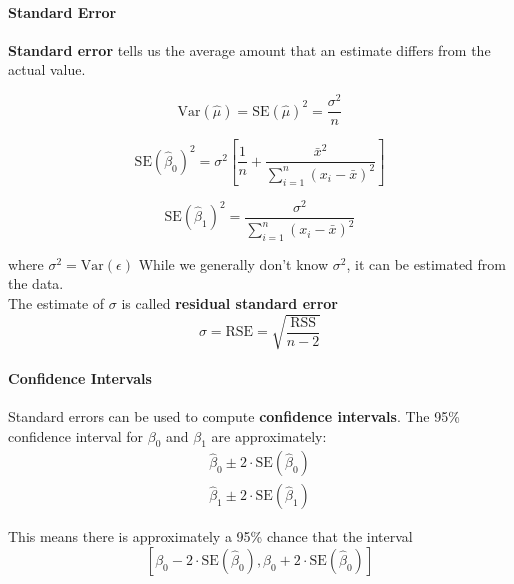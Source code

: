         \paragraph{Standard Error\\}
        \textbf{Standard error} tells us the average amount that an estimate differs from the actual value.
        
        \begin{equation*}
            \text{Var}(\hat \mu) = \text{SE}(\hat \mu)^2 = \frac{\sigma^2}{n}
        \end{equation*}
        
        
        \begin{equation*}
            \text{SE}(\hat \beta_0)^2 = \sigma^2 \left[ \frac{1}{n} + \frac{\bar x ^2}{\sum_{i=1}^n (x_i - \bar x)^2} \right]
        \end{equation*}
        
        \begin{equation*}
            \text{SE}(\hat \beta_1)^2 = \frac{\sigma^2}{\sum_{i=1}^n (x_i - \bar x)^2}
        \end{equation*}
        
        where \(\sigma^2 = \text{Var}(\epsilon)\) While we generally don't know \(\sigma^2\), it can be estimated from the data.\\
        The estimate of \(\sigma\) is called \textbf{residual standard error}
        \begin{equation*}
            \sigma = \text{RSE} = \sqrt{\frac{\text{RSS}}{n-2}}
        \end{equation*}
        
        \paragraph{Confidence Intervals\\}
         Standard errors can be used to compute    \textbf{confidence intervals}. The 95\% confidence interval for
        \(\beta_0\) and \(\beta_1\) are approximately: 
        \begin{gather*}
            \hat \beta_0 \pm 2 \cdot \text{SE}(\hat \beta_0)\\
            \hat \beta_1 \pm 2 \cdot \text{SE}(\hat \beta_1)
        \end{gather*}
        
        This means there is approximately a 95\% chance that the interval
        \begin{equation*}
            \left[\beta_0 - 2 \cdot \text{SE}(\hat \beta_0), \beta_0 + 2 \cdot \text{SE}(\hat \beta_0)\right]            
        \end{equation*}
        
